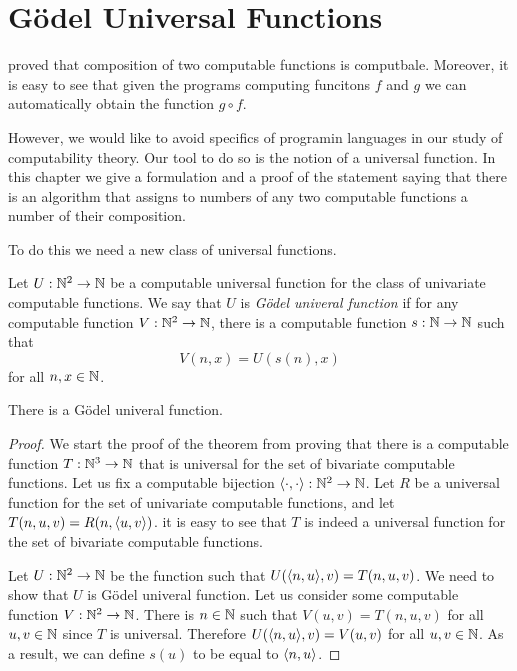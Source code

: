 \chapter{G\"odel Universal Functions}
 proved that composition of two computable functions
is computbale. Moreover, it is easy to see that given the programs computing
funcitons $f$ and $g$ we can automatically obtain the function $g \circ f$.

However, we would like to avoid specifics of programin languages in our study of
computability theory. Our tool to do so is the notion of a universal function.
In this chapter we give a formulation and a proof of the statement saying that
there is an algorithm that assigns to numbers of any two computable functions a
number of their composition.

To do this we need a new class of universal functions.
\begin{definition}
  Let $U : {\mathbb{N}}^2 \to {\mathbb{N}}$ be a computable universal function for the class of
  univariate computable functions. We say that $U$ is \emph{G\"odel univeral
  function} if for any computable function $V : {\mathbb{N}}^2 \to {\mathbb{N}}$, there is a
  computable function $s : {\mathbb{N}} \to {\mathbb{N}}$ such that 
  \[
    V(n, x) = U(s(n), x)
  \]
  for all $n, x \in {\mathbb{N}}$.
\end{definition}

\begin{theorem}
  There is a G\"odel univeral function.
\end{theorem}

\begin{proof}
  We start the proof of the theorem from proving that there is a computable
  function $T : {\mathbb{N}}^3 \to {\mathbb{N}}$ that is universal for the set of bivariate
  computable functions. Let us fix a computable bijection 
  $\langle {\cdot}, {\cdot} \rangle : {\mathbb{N}}^2 \to {\mathbb{N}}$. Let $R$ be a universal function for the set of
  univariate computable functions, and let $T(n, u, v) = R(n, \langle {u}, {v} \rangle)$.
  it is easy to see that $T$ is indeed a universal function for the set of
  bivariate computable functions.

  Let $U : {\mathbb{N}}^2 \to {\mathbb{N}}$ be the function such that $U(\langle {n}, {u} \rangle, v) = 
  T(n, u, v)$. We need to show that $U$ is G\"odel univeral function.
  Let us consider some computable function $V : {\mathbb{N}}^2 \to {\mathbb{N}}$. There is $n \in
  {\mathbb{N}}$ such that $V(u, v) = T(n, u, v)$ for all $u, v \in {\mathbb{N}}$ since $T$ is
  universal. Therefore $U(\langle {n}, {u} \rangle, v) = V(u, v)$ for all $u, v \in {\mathbb{N}}$.
  As a result, we can define $s(u)$ to be equal to $\langle {n}, {u} \rangle$.
\end{proof}

